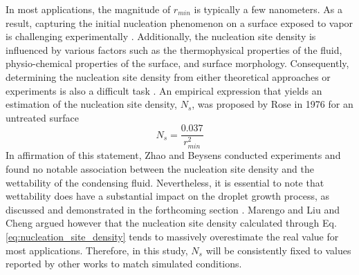 \documentclass[12pt]{article}
\numberwithin{equation}{section}
\begin{document}
In most applications, the magnitude of $r_{min}$ is typically a few nanometers. As a result, capturing the initial nucleation phenomenon on a surface exposed to vapor is challenging experimentally \cite{khandekar2020drop}. Additionally, the nucleation site density is influenced by various factors such as the thermophysical properties of the fluid, physio-chemical properties of the surface, and surface morphology. Consequently, determining the nucleation site density from either theoretical approaches or experiments is also a difficult task \cite{khandekar2020drop}. An empirical expression that yields an estimation of the nucleation site density, $N_{s}$, was proposed by Rose \cite{rose1976further} in 1976 for an untreated surface
\begin{equation}\label{eq:nucleation_site_density}
    N_{s}=\frac{0.037}{r_{min}^{2}}
\end{equation}
In affirmation of this statement, Zhao and Beysens \cite{zhao1995droplet} conducted experiments and found no notable association between the nucleation site density and the wettability of the condensing fluid. Nevertheless, it is essential to note that wettability does have a substantial impact on the droplet growth process, as discussed and demonstrated in the forthcoming section \cite{khandekar2020drop}. Marengo \cite{marengo2022surface} and Liu and Cheng \cite{liu2015dropwise} argued however that the nucleation site density calculated through Eq. \ref{eq:nucleation_site_density} tends to massively overestimate the real value for most applications. Therefore, in this study, $N_{s}$ will be consistently fixed to values reported by other works to match simulated conditions.
\end{document}
